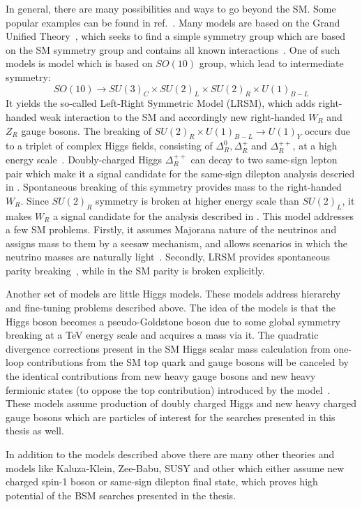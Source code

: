 In general, there are many possibilities and ways to go beyond the SM. 
Some popular examples can be found in ref.~\cite{Ellis:2011jb}.
Many models are based on the Grand Unified Theory~\cite{GUT_bigPaper},
which seeks to find a simple symmetry group which are based on the SM symmetry group
and contains all known interactions~\cite{Langacker:1984dc,Cvetic:1995zs}.
One of such models is model which is based on $SO(10)$ group, which lead to intermediate symmetry:
\begin{equation}
SO(10) \to SU(3)_C \times SU(2)_L \times SU(2)_R \times U(1)_{B-L}
\end{equation}
It yields the so-called Left-Right Symmetric Model (LRSM), which adds
right-handed weak interaction to the SM and accordingly new right-handed $W_R$ and $Z_R$ gauge bosons.
The breaking of $SU(2)_R \times U(1)_{B-L} \to U(1)_Y$ occurs due to a triplet of complex Higgs fields, consisting of $\Delta^0_R, \Delta^+_R$ and $\Delta^{++}_R$, at a high energy scale~\cite{Azuelos:2004mwa}.
Doubly-charged Higgs $\Delta^{++}_R$ can decay to two same-sign lepton pair which make it a signal candidate for the same-sign dilepton analysis descried in . Spontaneous breaking of this symmetry provides mass to the right-handed $W_R$.
Since $SU(2)_R$ symmetry is broken at higher energy scale than $SU(2)_L$, it makes
$W_R$ a signal candidate for the analysis described in .
This model addresses a few SM problems. Firstly, it assumes Majorana nature of the neutrinos and assigns mass to them by a seesaw mechanism, and allows scenarios in which the neutrino masses are naturally light~\cite{Mohapatra:1979ia}. 
Secondly, LRSM provides spontaneous parity breaking~\cite{Grimus:1993fx}, while in the SM parity is broken explicitly.

Another set of models are little Higgs models.
These models address hierarchy and fine-tuning problems described above.
The idea of the models is that the Higgs boson becomes a pseudo-Goldstone boson due to some global symmetry breaking at a TeV energy scale and acquires a mass via it.
The quadratic divergence corrections present in the SM Higgs scalar mass calculation from one-loop contributions from the SM top quark and gauge bosons will be canceled 
by the identical contributions from new heavy gauge bosons and new heavy fermionic states (to oppose the top contribution) introduced by the model~\cite{Han:2003wu,Brak}.
These models assume production of doubly charged Higgs and new heavy charged gauge bosons which are particles of interest for the searches presented in this thesis as well.

In addition to the models described above there are many other theories and models like Kaluza-Klein, Zee-Babu, SUSY and other which either assume new charged spin-1 boson or same-sign dilepton final state, which proves high potential of the BSM searches presented in the thesis.